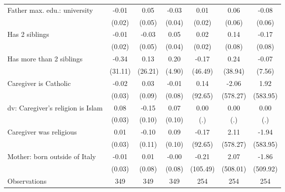 {\begin{tabular}{l*{6}{c}}
\addlinespace
Father max. edu.: university&       -0.01         &        0.05         &       -0.03         &        0.01         &        0.06         &       -0.08         \\
                    &      (0.02)         &      (0.05)         &      (0.04)         &      (0.02)         &      (0.06)         &      (0.06)         \\
\addlinespace
Has 2 siblings      &       -0.01         &       -0.03         &        0.05         &        0.02         &        0.14         &       -0.17\sym{*}  \\
                    &      (0.02)         &      (0.05)         &      (0.04)         &      (0.02)         &      (0.08)         &      (0.08)         \\
\addlinespace
Has more than 2 siblings&       -0.34         &        0.13         &        0.20         &       -0.17         &        0.24         &       -0.07         \\
                    &     (31.11)         &     (26.21)         &      (4.90)         &     (46.49)         &     (38.94)         &      (7.56)         \\
\addlinespace
Caregiver is Catholic&       -0.02         &        0.03         &       -0.01         &        0.14         &       -2.06         &        1.92         \\
                    &      (0.03)         &      (0.09)         &      (0.08)         &     (92.65)         &    (578.27)         &    (583.95)         \\
\addlinespace
dv: Caregiver's religion is Islam&        0.08\sym{**} &       -0.15         &        0.07         &        0.00         &        0.00         &        0.00         \\
                    &      (0.03)         &      (0.10)         &      (0.10)         &         (.)         &         (.)         &         (.)         \\
\addlinespace
Caregiver was religious&        0.01         &       -0.10         &        0.09         &       -0.17         &        2.11         &       -1.94         \\
                    &      (0.03)         &      (0.11)         &      (0.10)         &     (92.65)         &    (578.27)         &    (583.95)         \\
\addlinespace
Mother: born outside of Italy&       -0.01         &        0.01         &       -0.00         &       -0.21         &        2.07         &       -1.86         \\
                    &      (0.03)         &      (0.08)         &      (0.08)         &    (105.49)         &    (508.01)         &    (509.92)         \\
\midrule
Observations        &         349         &         349         &         349         &         254         &         254         &         254         \\
\bottomrule
\end{tabular}
}
